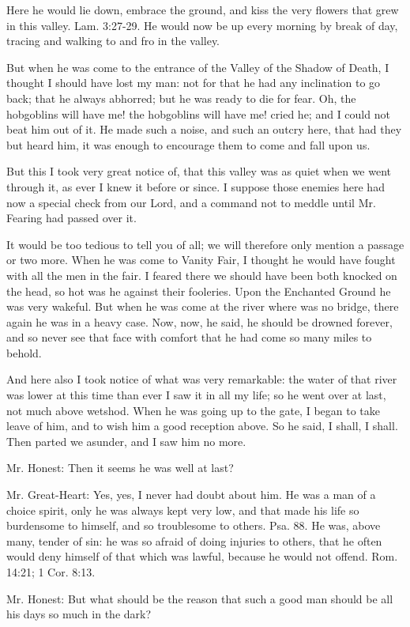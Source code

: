 Here he would lie down, embrace the ground, and kiss the very flowers that grew in this valley. Lam. 3:27-29. He would now be up every morning by break of day, tracing and walking to and fro in the valley.

But when he was come to the entrance of the Valley of the Shadow of Death, I thought I should have lost my man: not for that he had any inclination to go back; that he always abhorred; but he was ready to die for fear. Oh, the hobgoblins will have me! the hobgoblins will have me! cried he; and I could not beat him out of it. He made such a noise, and such an outcry here, that had they but heard him, it was enough to encourage them to come and fall upon us.

But this I took very great notice of, that this valley was as quiet when we went through it, as ever I knew it before or since. I suppose those enemies here had now a special check from our Lord, and a command not to meddle until Mr. Fearing had passed over it.

It would be too tedious to tell you of all; we will therefore only mention a passage or two more. When he was come to Vanity Fair, I thought he would have fought with all the men in the fair. I feared there we should have been both knocked on the head, so hot was he against their fooleries. Upon the Enchanted Ground he was very wakeful. But when he was come at the river where was no bridge, there again he was in a heavy case. Now, now, he said, he should be drowned forever, and so never see that face with comfort that he had come so many miles to behold.

And here also I took notice of what was very remarkable: the water of that river was lower at this time than ever I saw it in all my life; so he went over at last, not much above wetshod. When he was going up to the gate, I began to take leave of him, and to wish him a good reception above. So he said, I shall, I shall. Then parted we asunder, and I saw him no more.

Mr. Honest: Then it seems he was well at last?

Mr. Great-Heart: Yes, yes, I never had doubt about him. He was a man of a choice spirit, only he was always kept very low, and that made his life so burdensome to himself, and so troublesome to others. Psa. 88. He was, above many, tender of sin: he was so afraid of doing injuries to others, that he often would deny himself of that which was lawful, because he would not offend. Rom. 14:21; 1 Cor. 8:13.

Mr. Honest: But what should be the reason that such a good man should be all his days so much in the dark?

